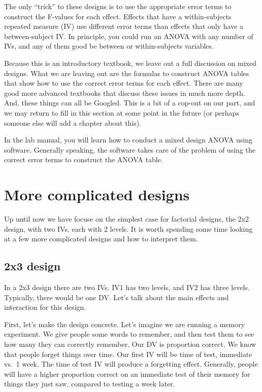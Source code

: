 \documentclass[
]{book}
\begin{document}
The only ``trick'' to these designs is to use the appropriate error terms to construct the F-values for each effect. Effects that have a within-subjects repeated measure (IV) use different error terms than effects that only have a between-subject IV. In principle, you could run an ANOVA with any number of IVs, and any of them good be between or within-subjects variables.

Because this is an introductory textbook, we leave out a full discussion on mixed designs. What we are leaving out are the formulas to construct ANOVA tables that show how to use the correct error terms for each effect. There are many good more advanced textbooks that discuss these issues in much more depth. And, these things can all be Googled. This is a bit of a cop-out on our part, and we may return to fill in this section at some point in the future (or perhaps someone else will add a chapter about this).

In the lab manual, you will learn how to conduct a mixed design ANOVA using software. Generally speaking, the software takes care of the problem of using the correct error terms to construct the ANOVA table.

\section{More complicated designs}\label{more-complicated-designs}

Up until now we have focuse on the simplest case for factorial designs, the 2x2 design, with two IVs, each with 2 levels. It is worth spending some time looking at a few more complicated designs and how to interpret them.

\subsection{2x3 design}\label{x3-design}

In a 2x3 design there are two IVs. IV1 has two levels, and IV2 has three levels. Typically, there would be one DV. Let's talk about the main effects and interaction for this design.

First, let's make the design concrete. Let's imagine we are running a memory experiment. We give people some words to remember, and then test them to see how many they can correctly remember. Our DV is proportion correct. We know that people forget things over time. Our first IV will be time of test, immediate vs.~1 week. The time of test IV will produce a forgetting effect. Generally, people will have a higher proportion correct on an immediate test of their memory for things they just saw, compared to testing a week later.
\end{document}
